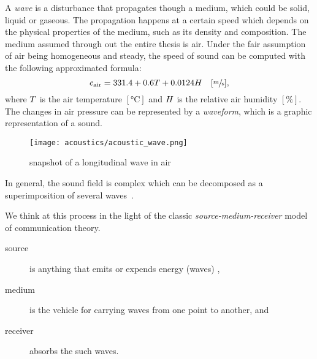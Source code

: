 A \textit{wave} is a disturbance that propagates though a medium, which could be solid, liquid or gaseous.
The propagation happens at a certain speed which depends on the physical properties of the medium, such as its density and composition.
The medium assumed through out the entire thesis is air.
Under the fair assumption of air being homogeneous and steady,
the speed of sound can be computed with the following approximated formula:
\begin{equation}
    c_\text{air} =  331.4 + 0.6T + 0.0124H \hspace{1em} [\sfrac{\si{\metre}}{\si{\second}}]
    ,
\end{equation}
where $T$ is the air temperature $[\si{\celsius}]$ and $H$ is the relative air humidity $[\%]$.
The changes in air pressure can be represented by a \textit{waveform}, which is a graphic representation of a sound.

\begin{figure}[h]
    \centering
    \texttt{[image: acoustics/acoustic\_wave.png]}
    \caption{snapshot of a longitudinal wave in air}
    \label{fig:acoustics:acoustics_wave}
\end{figure}
In general, the sound field is complex which can be decomposed as a superimposition of several waves~\cite{kuttruff2016room}.

We think at this process in the light of the classic \textit{source-medium-receiver} model of communication theory.
\begin{description}
    \item[source] is anything that emits or expends energy (waves)
    ,
    \item[medium] is the vehicle for carrying waves from one point to another, and
    \item[receiver] absorbs the such waves.
\end{description}

